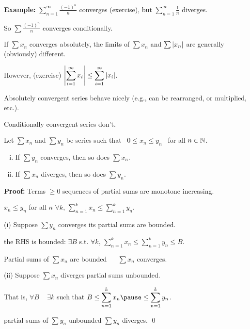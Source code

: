\documentclass[10pt,aspectratio=149]{beamer}
\begin{document}
\begin{frame}

\textbf{Example:}
$\displaystyle
\sum_{n=1}^\infty \frac{{(-1)}^n}{n}$
\quad
converges (exercise),
\pause
but
\quad
$\displaystyle
\sum_{n=1}^\infty \frac{1}{n}$
\quad
diverges.

\pause
\medskip

So $\sum \frac{{(-1)}^n}{n}$ converges conditionally.

\pause
\medskip

If $\sum x_n$ converges absolutely, the limits of
$\sum x_n$ and $\sum \left\lvert {x_n} \right\rvert$ are generally (obviously) different.

\pause
\medskip

However, (exercise)
\quad
$\displaystyle
\left\lvert { \sum_{i=1}^\infty x_i } \right\rvert
\leq
\sum_{i=1}^\infty \left\lvert {x_i} \right\rvert$.

\pause
\medskip

Absolutely convergent series behave nicely (e.g., can be rearranged, or
multiplied, etc.). 

\pause
\medskip

Conditionally convergent series don't.
\end{frame}

\begin{frame}

\begin{proposition}
Let $\sum x_n$ and $\sum y_n$ be series such that ~$0 \leq x_n \leq y_n$~
for all $n \in {\mathbb{N}}$.
\begin{enumerate}[(i)]
\item\pause If $\sum y_n$ converges, then so does $\sum x_n$.
\item\pause If $\sum x_n$ diverges, then so does $\sum y_n$.
\end{enumerate}
\end{proposition}

\pause
\textbf{Proof:}
Terms $\geq 0$ \wthus sequences of partial sums are monotone
increasing.

\pause
$x_n \leq y_n$ for all $n$ \wthus
$\forall k$,
\quad
$\displaystyle
\sum_{n=1}^k x_n \leq \sum_{n=1}^k y_n$.

\pause
(i) Suppose $\sum y_n$ converges \wthus its partial sums are bounded.

\pause
\thus \quad the RHS is bounded: \quad $\exists B$ s.t.
$\forall k$,
\quad
$\displaystyle
\sum_{n=1}^k x_n \leq \sum_{n=1}^k y_n \leq B$.

\pause
\medskip

Partial sums of $\sum x_n$ are bounded ~\thus~ $\sum x_n$ converges.

\pause
\medskip

(ii)
Suppose $\sum x_n$ diverges \wthus partial sums unbounded.

\pause
That is, $\forall B$ ~ $\exists k$ such that
\quad
$\displaystyle B \leq \sum_{n=1}^k x_n
\pause
\leq \sum_{n=1}^k y_n$.


\pause
\thus \quad partial sums of $\sum y_n$ unbounded \wthus $\sum y_n$ diverges.
\qed

\end{frame}
\end{document}
